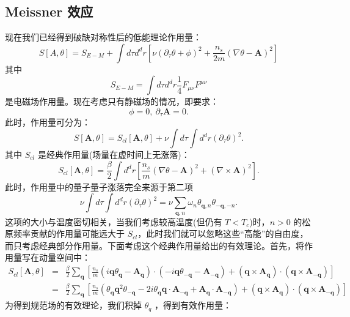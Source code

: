 \documentclass[10pt,UTF8]{ctexart}
\begin{document}
\subsection*{Meissner 效应}
\noindent 现在我们已经得到破缺对称性后的低能理论作用量：
\begin{equation}
	S[A,\theta] = S_{E-M} + \int d\tau d^d r \left[\nu (\partial_\tau \theta+ \phi)^2 + \frac{n_s}{2m}\left(\nabla\theta-\bm A \right)^2 \right] 
\end{equation}
其中
\begin{equation}
	S_{E-M} = \int d\tau d^d r \frac{1}{4}F_{\mu \nu} F^{\mu \nu}
\end{equation}
是电磁场作用量。现在考虑只有静磁场的情况，即要求：
\begin{equation}
	\phi = 0,\ \partial_\tau \bm A = 0.
\end{equation}
此时，作用量可分为：
\begin{equation}
	S[\bm A, \theta] = S_{cl}[\bm A,\theta]
	+ \nu \int d\tau \int d^d r (\partial_\tau \theta)^2.
\end{equation}
其中 $S_{cl}$ 是经典作用量(场量在虚时间上无涨落)：
\begin{equation}
	S_{cl}[\bm A,\theta] 
	= \frac{\beta}{2}\int d^d r \left[\frac{n_s}{m}(\nabla\theta-\bm A)^2+(\nabla \times \bm A)^2 \right].
\end{equation}
此时，作用量中的量子量子涨落完全来源于第二项
\begin{equation}
	\nu \int d\tau \int d^d r (\partial_\tau \theta)^2
	= \nu \sum_{\bm q,n} \omega_n \theta_{\bm q,n}\theta_{-\bm q,-n}.
\end{equation}
这项的大小与温度密切相关，当我们考虑较高温度(但仍有 $T < T_c$)时，$n>0$ 的松原频率贡献的作用量可能远大于 $S_{cl}$，此时我们就可以忽略这些“高能”的自由度，而只考虑经典部分作用量。下面考虑这个经典作用量给出的有效理论。首先，将作用量写在动量空间中：
\begin{eqnarray}
	S_{cl}[\bm A,\theta] 
	&=& \frac{\beta}{2}\sum_{\bm q}\left[\frac{n_s}{m}(i\bm q\theta_{\bm q}-\bm A_{\bm q})\cdot(-i\bm q\theta_{-\bm q}-\bm A_{-\bm q})+(\bm q \times \bm A_{\bm q})\cdot(\bm q \times \bm A_{-\bm q})\right] \nonumber \\
	&=& \frac{\beta}{2}\sum_{\bm q} \left[\frac{n_s}{m}(\theta_{\bm q} \bm q^2 \theta_{-\bm q}-2i\theta_{\bm q}\bm q\cdot\bm A_{-\bm q}+\bm A_{\bm q}\cdot \bm A_{-\bm q})+(\bm q \times \bm A_{\bm q})\cdot(\bm q \times \bm A_{-\bm q})\right]
\end{eqnarray}
为得到规范场的有效理论，我们积掉 $\theta_q$ ，得到有效作用量：
\end{document}
